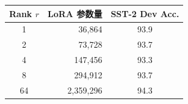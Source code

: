 \begin{tabular}{c r c}
\toprule
Rank $r$ & LoRA 参数量 & SST-2 Dev Acc. \\
\midrule
1 & 36,864 & 93.9 \\
2 & 73,728 & 93.7 \\
4 & 147,456 & 93.3 \\
8 & 294,912 & 93.7 \\
64 & 2,359,296 & 94.3 \\
\bottomrule
\end{tabular}